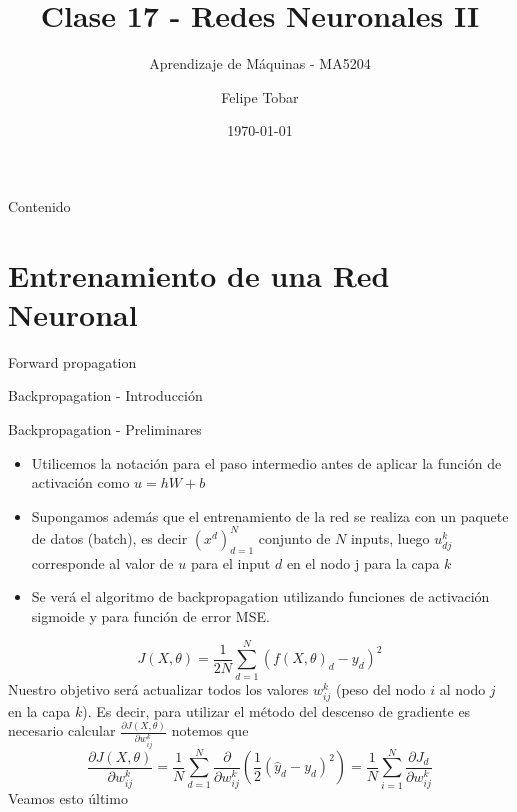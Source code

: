 \documentclass[9pt]{beamer}
\title{Clase 17 - Redes Neuronales II}
\subtitle{Aprendizaje de Máquinas - MA5204}
\date{\today}
\author{Felipe Tobar}
\institute{Department of Mathematical Engineering \&\\ Center for Mathematical Modelling\\Universidad de Chile}
\begin{document}
\begin{frame}
  \titlepage
\end{frame}
\begin{frame}{Contenido}
  \tableofcontents
  
\end{frame}

\section{Entrenamiento de una Red Neuronal}

\begin{frame}{Forward propagation}



\end{frame}

\begin{frame}{Backpropagation - Introducción}

\end{frame}

\begin{frame}{Backpropagation - Preliminares}

\begin{itemize}
  \item Utilicemos la notación para el paso intermedio antes de aplicar la función de activación como $u = hW + b$ \pause

  \item Supongamos además que el entrenamiento de la red se realiza con un paquete de datos (batch), es decir $(x^d)_{d=1}^N$  conjunto de $N$ inputs, luego $u_{dj}^k$ corresponde al valor de $u$ para el input $d$ en el nodo j para la capa $k$ \pause
 
 \item Se verá el algoritmo de backpropagation utilizando funciones de activación sigmoide y para función de error MSE. \pause

\end{itemize} 
\[
J(X , \theta) = \frac{1}{2N}\sum_{d=1}^N(f(X,\theta)_d-y_d)^2
\]
Nuestro objetivo será actualizar todos los valores $w_{ij}^k$ (peso del nodo $i$ al nodo $j$ en la capa $k$). Es decir, para utilizar el método del descenso de gradiente es necesario calcular $\frac{\partial J(X , \theta) }{\partial w_{ij}^k}$ notemos que \pause
\[
\frac{\partial J(X , \theta) }{\partial w_{ij}^k} = \frac{1}{N}\sum_{d=1}^N \frac{\partial}{\partial w_{ij}^k} \left ( \frac{1}{2}(\hat{y}_d-y_d)^2 \right) = \frac{1}{N}\sum_{i=1}^N \frac{\partial J_d}{\partial w_{ij}^k}
\]
Veamos esto último
\end{frame}
\end{document}
